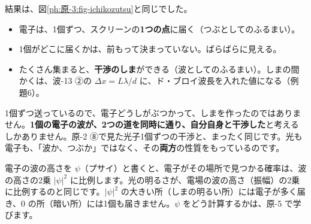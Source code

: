 結果は、図\ref{ph:原-3:fig-ichikozutsu}と同じでした。
\begin{itemize}[leftmargin=1.2\zw, itemsep=2pt, topsep=2pt, label={\color{bkTheme}●}]
\item 電子は、1個ずつ、スクリーンの\textbf{1つの点}に届く（つぶとしてのふるまい）。
\item 1個がどこに届くかは、前もって決まっていない。ばらばらに見える。
\item たくさん集まると、\textbf{干渉のしま}ができる（波としてのふるまい）。しまの間かくは、波-13 ②の $\Delta x=L\lambda/d$ に、ド・ブロイ波長を入れた値になる（例題6）。
\end{itemize}
1個ずつ送っているので、電子どうしがぶつかって、しまを作ったのではありません。\textbf{1個の電子の波が、2つの道を同時に通り、自分自身と干渉した}と考えるしかありません。原-2 ⑧で見た光子1個ずつの干渉と、まったく同じです。光も電子も、「波か、つぶか」ではなく、その\textbf{両方}の性質をもっているのです。

\begin{phyomi}[確率の波]
電子の波の高さを $\psi$（プサイ）と書くと、電子がその場所で見つかる確率は、波の高さの2乗 $|\psi|^2$ に比例します。光の明るさが、電場の波の高さ（振幅）の2乗に比例するのと同じです。$|\psi|^2$ の大きい所（しまの明るい所）には電子が多く届き、0 の所（暗い所）には1個も届きません。$\psi$ をどう計算するかは、原-5 で学びます。
\end{phyomi}

